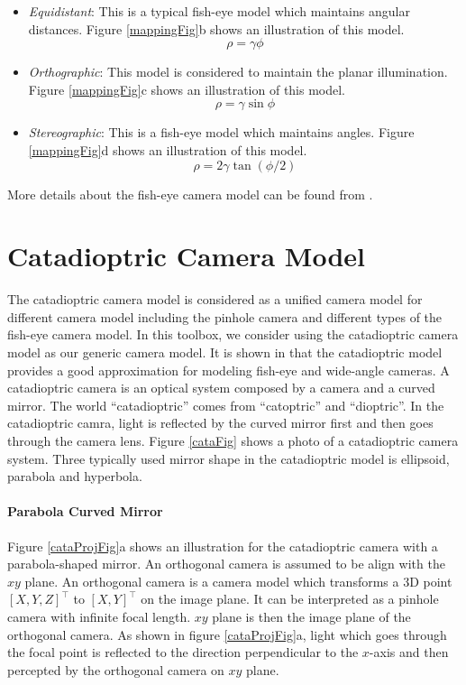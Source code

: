 \documentclass{report}
\begin{document}
\begin{itemize}
\item \textit{Equidistant}: This is a typical fish-eye model which maintains angular distances. Figure \ref{mappingFig}b shows an illustration of this model. 
\begin{equation}
\rho = \gamma \phi
\end{equation}
\item \textit{Orthographic}: This model is considered to maintain the planar illumination. Figure \ref{mappingFig}c shows an illustration of this model. 
\begin{equation}
\rho = \gamma \sin \phi
\end{equation}
\item \textit{Stereographic}: This is a fish-eye model which maintains angles. Figure \ref{mappingFig}d shows an illustration of this model. 
\begin{equation}
\rho = 2 \gamma \tan(\phi / 2)
\label{stereographicEqn}
\end{equation}
\end{itemize}
More details about the fish-eye camera model can be found from \cite{hughes2010accuracy}. 

\section{Catadioptric Camera Model}
The catadioptric camera model is considered as a unified camera model for different camera model including the pinhole camera and different types of the fish-eye camera model. 
In this toolbox, we consider using the catadioptric camera model as our generic camera model. It is shown in \cite{ying2004can} that the catadioptric model provides a good approximation for modeling fish-eye and wide-angle cameras. A catadioptric camera is an optical system composed by a camera and a curved mirror. The world ``catadioptric'' comes from ``catoptric'' and ``dioptric''. In the catadioptric camra, light is reflected by the curved mirror first and then goes through the camera lens. Figure \ref{cataFig} shows a photo of a catadioptric camera system. Three typically used mirror shape in the catadioptric model is ellipsoid, parabola and hyperbola. 
\paragraph{Parabola Curved Mirror} Figure \ref{cataProjFig}a shows an illustration for the catadioptric camera with a parabola-shaped mirror. An orthogonal camera is assumed to be align with the $xy$ plane. An orthogonal camera is a camera model which transforms a 3D point $[X, Y, Z]^\top$ to $[X, Y]^\top$ on the image plane. It can be interpreted as a pinhole camera with infinite focal length. $xy$ plane is then the image plane of the orthogonal camera. As shown in figure \ref{cataProjFig}a, light which goes through the focal point is reflected to the direction perpendicular to the $x$-axis and then percepted by the orthogonal camera on $xy$ plane. 
\end{document}
